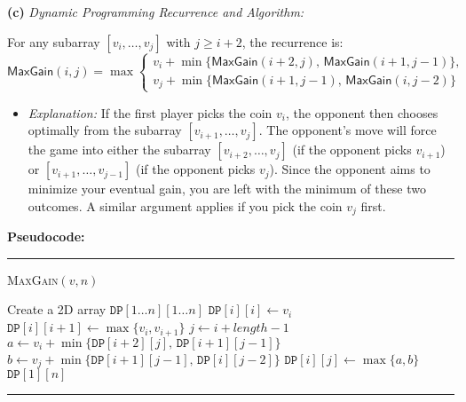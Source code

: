 \documentclass[11pt]{article}
\begin{document}
        \bigskip
        
        \textbf{(c)} \emph{Dynamic Programming Recurrence and Algorithm:}
        
        For any subarray \([v_i, \dots, v_j]\) with \(j \ge i+2\), the recurrence is:
        \[
        \mathsf{MaxGain}(i,j) = \max\left\{
        \begin{array}{l}
        v_i + \min\{\mathsf{MaxGain}(i+2,j),\, \mathsf{MaxGain}(i+1,j-1)\},\\[1mm]
        v_j + \min\{\mathsf{MaxGain}(i+1,j-1),\, \mathsf{MaxGain}(i,j-2)\}
        \end{array}
        \right.
        \]
        \begin{itemize}
            \item \emph{Explanation:}  
            If the first player picks the coin \(v_i\), the opponent then chooses optimally from the subarray \([v_{i+1}, \dots, v_j]\). The opponent’s move will force the game into either the subarray \([v_{i+2}, \dots, v_j]\) (if the opponent picks \(v_{i+1}\)) or \([v_{i+1}, \dots, v_{j-1}]\) (if the opponent picks \(v_j\)). Since the opponent aims to minimize your eventual gain, you are left with the minimum of these two outcomes. A similar argument applies if you pick the coin \(v_j\) first.
        \end{itemize}
        
        \textbf{Pseudocode:}
        
        \par\noindent\rule{\textwidth}{0.4pt}
        \smallskip        
        \textsc{MaxGain}$(v, n)$
        \begin{algorithmic}[1]
            \STATE Create a 2D array \(\texttt{DP}[1 \ldots n][1 \ldots n]\)
                \STATE \(\texttt{DP}[i][i] \gets v_i\) 
            \ENDFOR
                \STATE \(\texttt{DP}[i][i+1] \gets \max\{v_i, v_{i+1}\}\) 
            \ENDFOR
                    \STATE \(j \gets i + length - 1\)
                    \STATE \(a \gets v_i + \min\{\texttt{DP}[i+2][j],\, \texttt{DP}[i+1][j-1]\}\)
                    \STATE \(b \gets v_j + \min\{\texttt{DP}[i+1][j-1],\, \texttt{DP}[i][j-2]\}\)
                    \STATE \(\texttt{DP}[i][j] \gets \max\{a, b\}\)
                \ENDFOR
            \ENDFOR
            \RETURN \(\texttt{DP}[1][n]\)
        \end{algorithmic}
        \smallskip
        \par\noindent\rule{\textwidth}{0.4pt}
        
\end{document}
